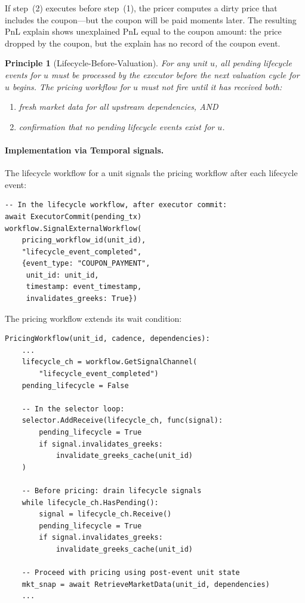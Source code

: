 \documentclass[11pt,a4paper]{article}
\newtheorem{principle}[definition]{Principle}
\begin{document}
\noindent If step~(2) executes before step~(1), the pricer computes a dirty price that includes the coupon---but the coupon will be paid moments later.  The resulting PnL explain shows unexplained PnL equal to the coupon amount: the price dropped by the coupon, but the explain has no record of the coupon event.

\begin{principle}[Lifecycle-Before-Valuation]
\label{princ:lifecycle-before-val}
For any unit $u$, all pending lifecycle events for $u$ must be processed by the executor before the next valuation cycle for $u$ begins.  The pricing workflow for $u$ must not fire until it has received both:
\begin{enumerate}[nosep]
\item[(a)] fresh market data for all upstream dependencies, AND
\item[(b)] confirmation that no pending lifecycle events exist for $u$.
\end{enumerate}
\end{principle}

\paragraph{Implementation via Temporal signals.}  The lifecycle workflow for a unit signals the pricing workflow after each lifecycle event:

\begin{lstlisting}
-- In the lifecycle workflow, after executor commit:
await ExecutorCommit(pending_tx)
workflow.SignalExternalWorkflow(
    pricing_workflow_id(unit_id),
    "lifecycle_event_completed",
    {event_type: "COUPON_PAYMENT",
     unit_id: unit_id,
     timestamp: event_timestamp,
     invalidates_greeks: True})
\end{lstlisting}

\noindent The pricing workflow extends its wait condition:

\begin{lstlisting}
PricingWorkflow(unit_id, cadence, dependencies):
    ...
    lifecycle_ch = workflow.GetSignalChannel(
        "lifecycle_event_completed")
    pending_lifecycle = False

    -- In the selector loop:
    selector.AddReceive(lifecycle_ch, func(signal):
        pending_lifecycle = True
        if signal.invalidates_greeks:
            invalidate_greeks_cache(unit_id)
    )

    -- Before pricing: drain lifecycle signals
    while lifecycle_ch.HasPending():
        signal = lifecycle_ch.Receive()
        pending_lifecycle = True
        if signal.invalidates_greeks:
            invalidate_greeks_cache(unit_id)

    -- Proceed with pricing using post-event unit state
    mkt_snap = await RetrieveMarketData(unit_id, dependencies)
    ...
\end{lstlisting}
\end{document}
